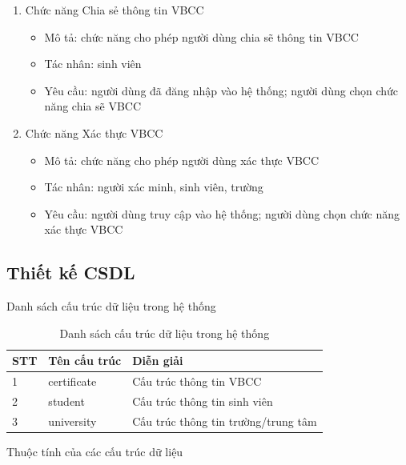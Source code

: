 \begin{enumerate}
\item 
Chức năng Chia sẻ thông tin VBCC
\begin{itemize}
\item Mô tả: chức năng cho phép người dùng chia sẽ thông tin VBCC 
\item Tác nhân: sinh viên 
\item Yêu cầu: người dùng đã đăng nhập vào hệ thống; người dùng chọn chức năng chia sẽ VBCC
\end{itemize}

\item 
Chức năng Xác thực VBCC
\begin{itemize}
\item Mô tả: chức năng cho phép người dùng xác thực VBCC
\item Tác nhân: người xác minh, sinh viên, trường 
\item Yêu cầu: người dùng truy cập vào hệ thống; người dùng chọn chức năng xác thực VBCC
\end{itemize}

\end{enumerate}

\subsection{Thiết kế CSDL}

Danh sách cấu trúc dữ liệu trong hệ thống


\begin{table}[H]
\caption{Danh sách cấu trúc dữ liệu trong hệ thống}
	\label{table:dataschema}
	\begin{tabularx} {\textwidth} {|p{1cm}|p{3cm}|X|}
\hline
		STT &	Tên cấu trúc & Diễn giải \\ \hline
		1 & certificate	& Cấu trúc thông tin VBCC\\ \hline
		2 & student & Cấu trúc thông tin sinh viên \\ \hline
		3 & university	&Cấu trúc thông tin trường/trung tâm \\ \hline
	\end{tabularx}
\end{table}

Thuộc tính của các cấu trúc dữ liệu

